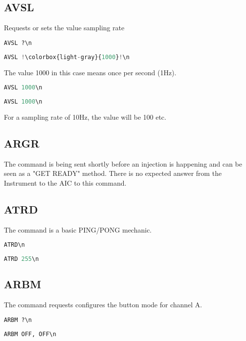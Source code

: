 \documentclass[]{scrartcl}
\begin{document}
	\subsection{AVSL}
	Requests or sets the value sampling rate
\begin{lstlisting}[language=Python,escapechar=!,caption=Requesting (AIC$\rightarrow{}$Instrument) Sampling rate currently set,breaklines=true,showspaces=true]
AVSL ?\n
\end{lstlisting}
\begin{lstlisting}[language=Python,escapechar=!,caption=Response (Instrument$\rightarrow{}$AIC) Sampling rate currently set,breaklines=true,showspaces=true]
AVSL !\colorbox{light-gray}{1000}!\n
\end{lstlisting}
The value 1000 in this case means once per second (1Hz).
\begin{lstlisting}[language=Python,escapechar=!,caption=Setting (AIC$\rightarrow{}$Instrument) Sampling rate ,breaklines=true,showspaces=true]
AVSL 1000\n
\end{lstlisting}
\begin{lstlisting}[language=Python,escapechar=!,caption=Response to setting Sampling Rate (Instrument$\rightarrow{}$AIC) ,breaklines=true,showspaces=true]
AVSL 1000\n
\end{lstlisting}
For a sampling rate of 10Hz, the value will be 100 etc.
	\subsection{ARGR}
	The  command is being sent shortly before an injection is happening and can be seen as a "GET READY" method.
	There is no expected answer from the Instrument to the AIC to this command.

	\subsection{ATRD}
	The  command is a basic PING/PONG mechanic.
\begin{lstlisting}[language=Python,escapechar=!,caption=Request (AIC$\rightarrow{}$Instrument),breaklines=true,showspaces=true]
ATRD\n
\end{lstlisting}
\begin{lstlisting}[language=Python,escapechar=!,caption=Response (Instrument$\rightarrow{}$AIC) ,breaklines=true,showspaces=true]
ATRD 255\n
\end{lstlisting}

	\subsection{ARBM}
	The  command requests configures the button mode for channel A.
\begin{lstlisting}[language=Python,escapechar=!,caption=Request (AIC$\rightarrow{}$Instrument),breaklines=true,showspaces=true]
ARBM ?\n
\end{lstlisting}
\begin{lstlisting}[language=Python,escapechar=!,caption=Response (Instrument$\rightarrow{}$AIC) ,breaklines=true,showspaces=true]
ARBM OFF, OFF\n
\end{lstlisting}
\end{document}
